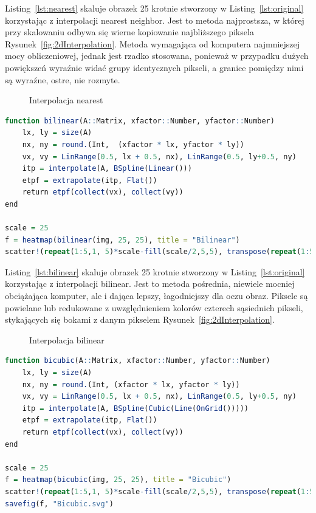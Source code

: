 \documentclass[12pt, a4paper]{article}
\begin{document}
Listing~\ref{lst:nearest} skaluje obrazek 25 krotnie stworzony w Listing~\ref{lst:original} korzystając z interpolacji nearest neighbor. Jest to metoda najprostsza, w której przy skalowaniu odbywa się wierne kopiowanie najbliższego piksela Rysunek~\ref{fig:2dInterpolation}. Metoda wymagająca od komputera najmniejszej mocy obliczeniowej, jednak jest rzadko stosowana, ponieważ w przypadku dużych powiększeń wyraźnie widać grupy identycznych pikseli, a granice pomiędzy nimi są wyraźne, ostre, nie rozmyte.
\begin{figure}[ht!]
	\centering    
	\def\svgwidth{\columnwidth}
	
	\caption{Interpolacja nearest}
	\label{fig:nearest}
\end{figure}
\clearpage
\begin{lstlisting}[caption={Interpolacja bilinear},language=R,label={lst:bilinear}]
function bilinear(A::Matrix, xfactor::Number, yfactor::Number)
	lx, ly = size(A)
	nx, ny = round.(Int,  (xfactor * lx, yfactor * ly))
	vx, vy = LinRange(0.5, lx + 0.5, nx), LinRange(0.5, ly+0.5, ny)
	itp = interpolate(A, BSpline(Linear()))
	etpf = extrapolate(itp, Flat())
	return etpf(collect(vx), collect(vy))
end

scale = 25
f = heatmap(bilinear(img, 25, 25), title = "Bilinear")
scatter!(repeat(1:5,1, 5)*scale-fill(scale/2,5,5), transpose(repeat(1:5,1, 5)*scale-fill(scale/2,5,5)), legend=false, color = :white)
\end{lstlisting}
Listing~\ref{lst:bilinear} skaluje obrazek 25 krotnie stworzony w Listing~\ref{lst:original} korzystając z interpolacji bilinear. Jest to   metoda pośrednia, niewiele mocniej obciążająca komputer, ale i dająca lepszy, łagodniejszy dla oczu obraz. Piksele są powielane lub redukowane z uwzględnieniem kolorów czterech sąsiednich pikseli, stykających się bokami z danym pikselem Rysunek~\ref{fig:2dInterpolation}.
\begin{figure}[ht!]
	\centering    
	\def\svgwidth{\columnwidth}
	
	\caption{Interpolacja bilinear}
	\label{fig:bilinear}
\end{figure}
\clearpage
\begin{lstlisting}[caption={Interpolacja bicubic},language=R,label={lst:bicubic}]
function bicubic(A::Matrix, xfactor::Number, yfactor::Number)
	lx, ly = size(A)
	nx, ny = round.(Int, (xfactor * lx, yfactor * ly))
	vx, vy = LinRange(0.5, lx + 0.5, nx), LinRange(0.5, ly+0.5, ny)
	itp = interpolate(A, BSpline(Cubic(Line(OnGrid()))))
	etpf = extrapolate(itp, Flat())
	return etpf(collect(vx), collect(vy))
end

scale = 25
f = heatmap(bicubic(img, 25, 25), title = "Bicubic")
scatter!(repeat(1:5,1, 5)*scale-fill(scale/2,5,5), transpose(repeat(1:5,1, 5)*scale-fill(scale/2,5,5)), legend=false, color = :white)
savefig(f, "Bicubic.svg")
\end{lstlisting}
\end{document}
